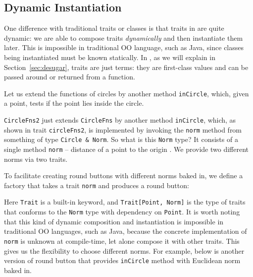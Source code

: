 \subsection{Dynamic Instantiation}

One difference with traditional traits or classes is that traits in \name are
quite dynamic: we are able to compose traits \textit{dynamically} and then
instantiate them later. This is impossible in traditional OO language, such as
Java, since classes being instantiated must be known statically. In \name, as we
will explain in Section~\ref{sec:desugar}, traits are just terms: they are
first-class values and can be passed around or returned from a function.

Let us extend the functions of circles by another method \lstinline{inCircle},
which, given a point, tests if the point lies inside the circle.

\lstinline{CircleFns2} just extends \lstinline{CircleFns} by another method
\lstinline{inCircle}, which, as shown in trait \lstinline{circleFns2}, is
implemented by invoking the \lstinline{norm} method from something of type
\lstinline{Circle & Norm}. So what is this \lstinline{Norm} type? It consists of
a single method \lstinline{norm} -- distance of a point to the origin . We
provide two different norms via two traits.

To facilitate creating round buttons with different norms baked in, we define a
factory that takes a trait \lstinline$norm$ and produces a round button:

Here \lstinline{Trait} is a built-in keyword, and \lstinline$Trait[Point, Norm]$
is the type of traits that conforms to the \lstinline$Norm$ type with dependency
on \lstinline{Point}. It is worth noting that this kind of dynamic composition
and instantiation is impossible in traditional OO languages, such as Java,
because the concrete implementation of \lstinline{norm} is unknown at
compile-time, let alone compose it with other traits. This gives us the
flexibility to choose different norms. For example, below is another version of
round button that provides \lstinline{inCircle} method with Euclidean norm baked
in.
